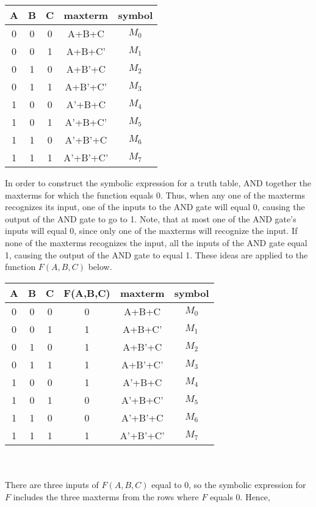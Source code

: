 \begin{tabular}{c|c|c||c|c}
A & B & C & maxterm   & symbol \\ \hline
0 & 0 & 0 & A+B+C     & $M_0$   \\ \hline
0 & 0 & 1 & A+B+C'    & $M_1$   \\ \hline
0 & 1 & 0 & A+B'+C    & $M_2$   \\ \hline
0 & 1 & 1 & A+B'+C'   & $M_3$   \\ \hline
1 & 0 & 0 & A'+B+C    & $M_4$   \\ \hline
1 & 0 & 1 & A'+B+C'   & $M_5$   \\ \hline
1 & 1 & 0 & A'+B'+C   & $M_6$   \\ \hline
1 & 1 & 1 & A'+B'+C'  & $M_7$   \\ 
\end{tabular}


In order to construct the symbolic expression for a truth table, 
AND together the maxterms for which the function equals 0. Thus, 
when any one of the maxterms recognizes its input, one of the 
inputs to the AND gate will equal 0, causing the output of the 
AND gate to go to 1.  Note, that at most one of the AND gate's 
inputs will equal 0, since only one of the maxterms will recognize 
the input.  If none of the maxterms recognizes the input, all the 
inputs of the AND gate equal 1, causing the output of the 
AND gate to equal 1.  These ideas are applied to 
the function $F(A,B,C)$ below.

\begin{tabular}{c|c|c||c|c|c}
A & B & C & F(A,B,C) & maxterm   & symbol \\ \hline
0 & 0 & 0 & 0        & A+B+C     & $M_0$   \\ \hline
0 & 0 & 1 & 1        & A+B+C'    & $M_1$   \\ \hline
0 & 1 & 0 & 1        & A+B'+C    & $M_2$   \\ \hline
0 & 1 & 1 & 1        & A+B'+C'   & $M_3$   \\ \hline
1 & 0 & 0 & 1        & A'+B+C    & $M_4$   \\ \hline
1 & 0 & 1 & 0        & A'+B+C'   & $M_5$   \\ \hline
1 & 1 & 0 & 0        & A'+B'+C   & $M_6$   \\ \hline
1 & 1 & 1 & 1        & A'+B'+C'  & $M_7$   \\ 
\end{tabular}
\\ \\
There are three inputs of $F(A,B,C)$ equal to 0, so the symbolic
expression for $F$ includes the three maxterms from the rows where
$F$ equals 0.  Hence, 

